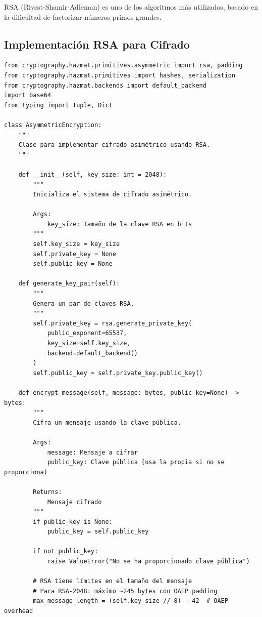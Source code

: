 \documentclass[12pt,a4paper]{article}
\begin{document}
RSA (Rivest-Shamir-Adleman) es uno de los algoritmos más utilizados, basado en
la dificultad de factorizar números primos grandes.

\subsection{Implementación RSA para Cifrado}

\begin{lstlisting}[caption=Implementación de cifrado asimétrico con RSA]
from cryptography.hazmat.primitives.asymmetric import rsa, padding
from cryptography.hazmat.primitives import hashes, serialization
from cryptography.hazmat.backends import default_backend
import base64
from typing import Tuple, Dict

class AsymmetricEncryption:
    """
    Clase para implementar cifrado asimétrico usando RSA.
    """
    
    def __init__(self, key_size: int = 2048):
        """
        Inicializa el sistema de cifrado asimétrico.
        
        Args:
            key_size: Tamaño de la clave RSA en bits
        """
        self.key_size = key_size
        self.private_key = None
        self.public_key = None
        
    def generate_key_pair(self):
        """
        Genera un par de claves RSA.
        """
        self.private_key = rsa.generate_private_key(
            public_exponent=65537,
            key_size=self.key_size,
            backend=default_backend()
        )
        self.public_key = self.private_key.public_key()
        
    def encrypt_message(self, message: bytes, public_key=None) -> bytes:
        """
        Cifra un mensaje usando la clave pública.
        
        Args:
            message: Mensaje a cifrar
            public_key: Clave pública (usa la propia si no se proporciona)
            
        Returns:
            Mensaje cifrado
        """
        if public_key is None:
            public_key = self.public_key
            
        if not public_key:
            raise ValueError("No se ha proporcionado clave pública")
            
        # RSA tiene límites en el tamaño del mensaje
        # Para RSA-2048: máximo ~245 bytes con OAEP padding
        max_message_length = (self.key_size // 8) - 42  # OAEP overhead
        

\end{lstlisting}
\end{document}
